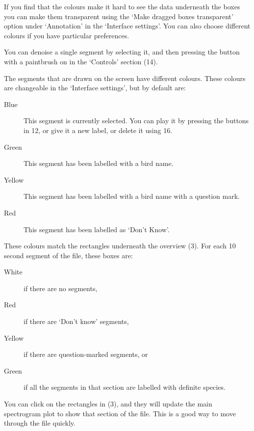 \documentclass{article}
\begin{document}
If you find that the colours make it hard to see the data underneath the boxes you can make them transparent using the `Make dragged boxes transparent' option under `Annotation' in the `Interface settings'. You can also choose different colours if you have particular preferences.

You can denoise a single segment by selecting it, and then pressing the button with a paintbrush on in the `Controls' section (14). 


The segments that are drawn on the screen have different colours. These colours are changeable in the `Interface settings', but by default are:
	\begin{description} 
	\item[Blue] This segment is currently selected. You can play it by pressing the buttons in 12, or give it a new label, or delete it using 16. 
	\item[Green] This segment has been labelled with a bird name.
	\item[Yellow] This segment has been labelled with a bird name with a question mark.
	\item[Red] This segment has been labelled as `Don't Know'.
	\end{description}

These colours match the rectangles underneath the overview (3). For each 10 second segment of the file, these boxes are:
	\begin{description} 
 	\item[White] if there are no segments, 
	\item[Red] if there are `Don't know' segments, 
	\item[Yellow] if there are question-marked segments, or 
	\item[Green] if all the segments in that section are labelled with definite species. 
	\end{description}
	
You can click on the rectangles in (3), and they will update the main spectrogram plot to show that section of the file. This is a good way to move through the file quickly.
\end{document}
